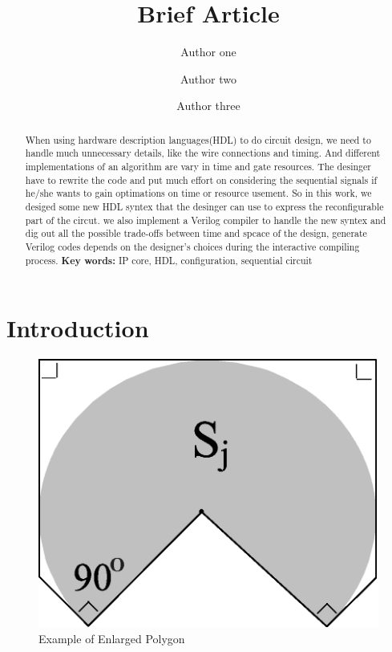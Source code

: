 \documentclass[11pt]{article} %
\title{Brief Article}
\author{Author one\and Author two\and Author three}
\begin{document}
\maketitle

\begin{abstract}
When using hardware description languages(HDL) to do circuit design, we need to handle much unnecessary details, like the wire connections and timing. And different implementations of an algorithm are vary in time and gate resources. The  desinger have to rewrite the code and put much effort on considering the sequential signals if he/she wants to gain optimations on time or resource usement. So in this work, we desiged some new HDL syntex that the desinger can use to express the reconfigurable part of the circut. we also implement a Verilog compiler to handle the new syntex and dig out all the possible trade-offs between time and spcace of the design, generate Verilog codes depends on the designer's choices during the interactive compiling process.\newline\newline
\textbf{Key words: }IP core, HDL, configuration, sequential circuit
\end{abstract}



\section{Introduction}

\begin{figure}
\centering
\includegraphics{fig10a}
\caption{Example of Enlarged Polygon}
\label{fig:10}
\end{figure}
\end{document}
